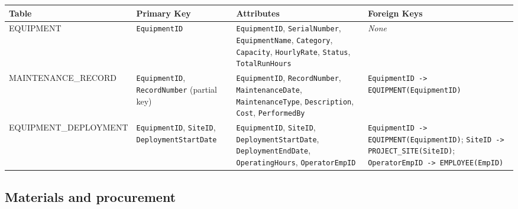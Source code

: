 \documentclass[a4paper,12pt]{report}
\newcounter{none} %
\begin{document}
{\def\LTcaptype{none} %
\begin{longtable}[]{@{}
  >{\raggedright\arraybackslash}p{}
  >{\raggedright\arraybackslash}p{}
  >{\raggedright\arraybackslash}p{}
  >{\raggedright\arraybackslash}p{}@{}}
\toprule\noalign{}
\begin{minipage}[b]{\linewidth}\raggedright
Table
\end{minipage} & \begin{minipage}[b]{\linewidth}\raggedright
Primary Key
\end{minipage} & \begin{minipage}[b]{\linewidth}\raggedright
Attributes
\end{minipage} & \begin{minipage}[b]{\linewidth}\raggedright
Foreign Keys
\end{minipage} \\
\midrule\noalign{}
\endhead
\bottomrule\noalign{}
\endlastfoot
EQUIPMENT & \texttt{EquipmentID} & \texttt{EquipmentID}, \texttt{SerialNumber}, \texttt{EquipmentName}, \texttt{Category}, \texttt{Capacity}, \texttt{HourlyRate}, \texttt{Status}, \texttt{TotalRunHours} & \emph{None} \\
MAINTENANCE\_\allowbreak{}RECORD & \texttt{EquipmentID}, \texttt{RecordNumber} (\allowbreak{}partial key) & \texttt{EquipmentID}, \texttt{RecordNumber}, \texttt{MaintenanceDate}, \texttt{MaintenanceType}, \texttt{Description}, \texttt{Cost}, \texttt{PerformedBy} & \texttt{EquipmentID -\textgreater{} EQUIPMENT(\allowbreak{}\allowbreak{}EquipmentID)} \\
EQUIPMENT\_\allowbreak{}DEPLOYMENT & \texttt{EquipmentID}, \texttt{SiteID}, \texttt{DeploymentStartDate} & \texttt{EquipmentID}, \texttt{SiteID}, \texttt{DeploymentStartDate}, \texttt{DeploymentEndDate}, \texttt{OperatingHours}, \texttt{OperatorEmpID} & \texttt{EquipmentID -\textgreater{} EQUIPMENT(\allowbreak{}\allowbreak{}EquipmentID)}; \texttt{SiteID -\textgreater{} PROJECT\_\allowbreak{}SITE(\allowbreak{}\allowbreak{}SiteID)}; \texttt{OperatorEmpID -\textgreater{} EMPLOYEE(\allowbreak{}\allowbreak{}EmpID)} \\
\end{longtable}
}

\subsection{Materials and procurement}\label{materials-and-procurement}
\end{document}
